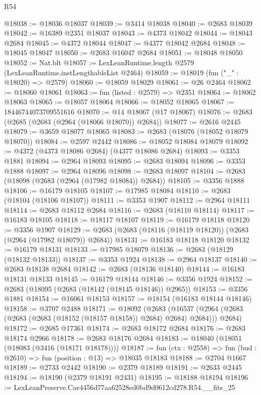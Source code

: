 \begin{lexlean}{R54}
\begin{coremodule}
@18038 := @18036 @18037
@18039 := @3414 @18038
@18040 := @2683 @18039
@18042 := @16389 @2351 @18037
@18043 := @4373 @18042
@18044 := @18043 @2684
@18045 := @4372 @18044
@18047 := @4377 @18042 @2684
@18048 := @18045 @18047
@18050 := @2683 @16047 @2684
@18051 := @18048 @18050
@18052 := Nat.blt
@18057 := LexLeanRuntime.length @2579 (LexLeanRuntime.instLengthableList @2464)
@18059 := @18019 (fun ("_" : @18020) => @2579)
@18060 := @18059 @18029
@18061 := @26 @2464
@18062 := @18060 @18061
@18063 := fun (listed : @2579) => @2351
@18064 := @18062 @18063
@18065 := @18057 @18064
@18066 := @18052 @18065
@18067 := 18446744073709551616
@18070 := @14 @18067 (@17 @18067)
@18076 := @2683 (@2685 (@2683 (@2964 (@18066 @18070)) @2684))
@18077 := @2616 @2445
@18079 := @3659 @18077 @18065
@18083 := @2683 (@18076 (@18052 @18079 @18070))
@18084 := @2597 @2442
@18086 := @18052 @18084 @18079
@18092 := @4372 (@4373 @18086 @2684) (@4377 @18086 @2684)
@18093 := @3353 @1881
@18094 := @2964 @18093
@18095 := @2683 @18094
@18096 := @3353 @1888
@18097 := @2964 @18096
@18098 := @2683 @18097
@18104 := @2683 (@18098 (@2683 (@2964 (@17982 @18084)) @2684))
@18105 := @3356 @1888
@18106 := @16179 @18105
@18107 := @17985 @18084
@18110 := @2683 (@18104 (@18106 @18107))
@18111 := @3353 @1907
@18112 := @2964 @18111
@18114 := @2683 @18112 @2684
@18116 := @2683 (@18110 @18114)
@18117 := @16183 @18105
@18118 := @18117 @18107
@18119 := @16179 @18118
@18120 := @3356 @1907
@18129 := @2683 (@2683 (@18116 (@18119 @18120)) (@2683 (@2964 (@17982 @18079)) @2684))
@18131 := @16183 @18118 @18120
@18132 := @16179 @18131
@18133 := @17985 @18079
@18136 := @2683 (@18129 (@18132 @18133))
@18137 := @3353 @1924
@18138 := @2964 @18137
@18140 := @2683 @18138 @2684
@18142 := @2683 (@18136 @18140)
@18144 := @16183 @18131 @18133
@18145 := @16179 @18144
@18146 := @3356 @1924
@18152 := @2683 (@18095 (@2683 (@18142 (@18145 @18146)) @2965))
@18153 := @3356 @1881
@18154 := @16061 @18153
@18157 := @18154 (@16183 @18144 @18146)
@18158 := @3707 @2488
@18171 := @18092
    (@2683
      (@16537 (@2964 (@2683 (@2683 (@2683 (@18152 (@18157 @18158)) @2684) @2684) @2684)))
      @2684)
@18172 := @2685 @17361
@18174 := @2683 @18172 @2684
@18176 := @2683 @18174 @2966
@18178 := @2683 @18176 @2684
@18183 := @18040 (@18051 (@18083 (@3416 (@18171 @18178))))
@18187 := fun (ctx : @2558) => fun (bud : @2610) => fun (position : @13) => @18035 @18183
@18188 := @2704 @1667
@18189 := @2733 @2442
@18190 := @2379 @18189
@18191 := @2633 @2445
@18194 := @18190 (@2379 @18191 @2431)
@18195 := @18188 @18194
@18196 := LexLeanPreserve.Cae4456d77aa62528ed0bd9d0612cd278.R54.__fits_25

\end{coremodule}
\end{lexlean}
